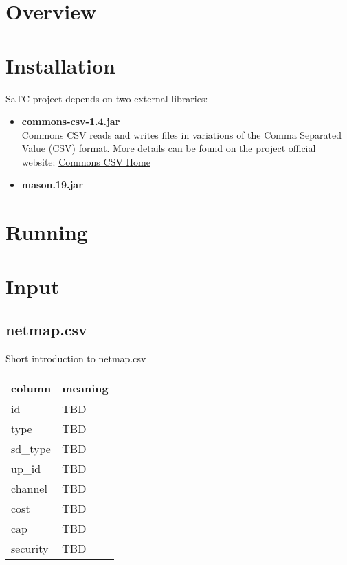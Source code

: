 \documentclass[12pt]{article}
\begin{document}
\tableofcontents

\newpage

\section{Overview}

\section {Installation} 

SaTC project depends on two external libraries: 

\begin{itemize}
    \item{\textbf{commons-csv-1.4.jar}} \\
        Commons CSV reads and writes files in variations of the Comma Separated Value (CSV) format. 
        More details can be found on the project official website: 
        \href{https://commons.apache.org/proper/commons-csv/}{Commons CSV Home}
    \item{\textbf{mason.19.jar}} \\
        
\end{itemize}

\section{Running}

\section{Input}

\subsection{netmap.csv}

Short introduction to netmap.csv \\

\noindent
\begin{tabular} {| l | l |}
    \hline
    \textbf{column} & \textbf{meaning} \\ \hline
    id & TBD \\ \hline
    type & TBD \\ \hline
    sd\_type & TBD \\ \hline
    up\_id & TBD \\ \hline
    channel & TBD \\ \hline
    cost & TBD \\ \hline
    cap & TBD \\ \hline
    security & TBD \\ \hline
\end{tabular}
\end{document}
